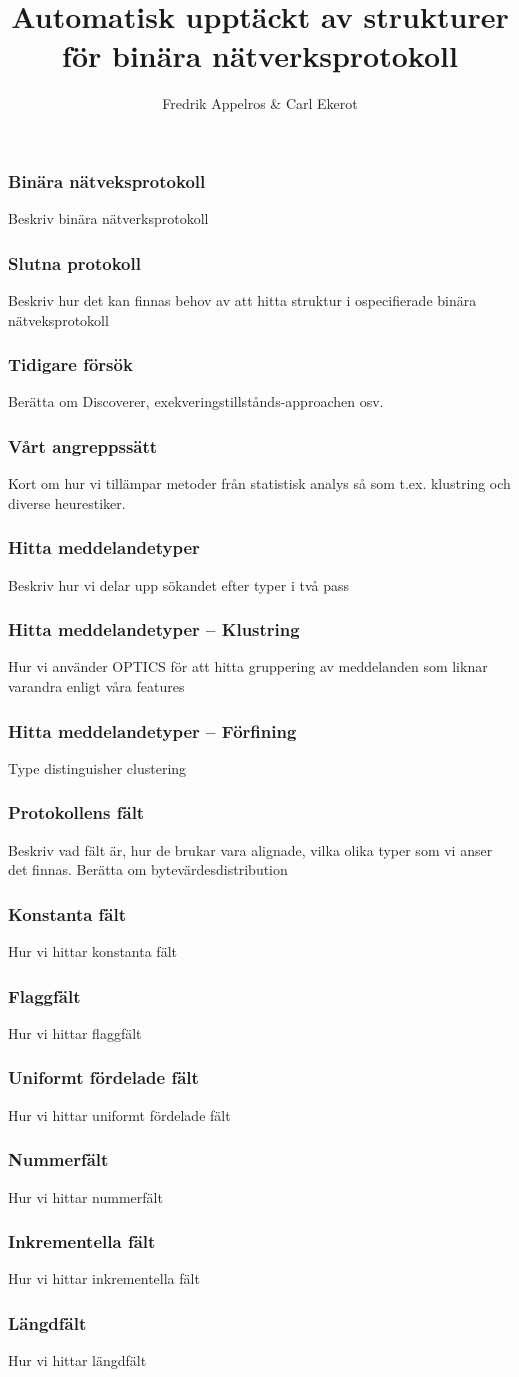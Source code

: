 \documentclass[xetex]{beamer}
\title{Automatisk upptäckt av strukturer för binära nätverksprotokoll}
\author{Fredrik Appelros \& Carl Ekerot}
\date
\begin{document}
    \frame{\titlepage}
    
    \begin{frame}
        \frametitle{Binära nätveksprotokoll}
        Beskriv binära nätverksprotokoll
    \end{frame}
    \begin{frame}
        \frametitle{Slutna protokoll}
        Beskriv hur det kan finnas behov av att hitta struktur i
        ospecifierade binära nätveksprotokoll
    \end{frame}
    \begin{frame}
        \frametitle{Tidigare försök}
        Berätta om Discoverer, exekveringstillstånds-approachen osv.
    \end{frame}

    \begin{frame}
        \frametitle{Vårt angreppssätt}
        Kort om hur vi tillämpar metoder från statistisk analys så
        som t.ex. klustring och diverse heurestiker.
    \end{frame}
    
    \begin{frame}
        \frametitle{Hitta meddelandetyper}
        Beskriv hur vi delar upp sökandet efter typer i två pass
    \end{frame}
    \begin{frame}
        \frametitle{Hitta meddelandetyper -- Klustring}
        Hur vi använder OPTICS för att hitta gruppering av meddelanden som
        liknar varandra enligt våra features
    \end{frame}
    \begin{frame}
        \frametitle{Hitta meddelandetyper -- Förfining}
        Type distinguisher clustering
    \end{frame}

    \begin{frame}
        \frametitle{Protokollens fält}
        Beskriv vad fält är, hur de brukar vara alignade, vilka olika typer
        som vi anser det finnas. Berätta om bytevärdesdistribution
    \end{frame}
    \begin{frame}
        \frametitle{Konstanta fält}
        Hur vi hittar konstanta fält
    \end{frame}
    \begin{frame}
        \frametitle{Flaggfält}
        Hur vi hittar flaggfält
    \end{frame}
    \begin{frame}
        \frametitle{Uniformt fördelade fält}
        Hur vi hittar uniformt fördelade fält
    \end{frame}
    \begin{frame}
        \frametitle{Nummerfält}
        Hur vi hittar nummerfält
    \end{frame}
    \begin{frame}
        \frametitle{Inkrementella fält}
        Hur vi hittar inkrementella fält
    \end{frame}
    \begin{frame}
        \frametitle{Längdfält}
        Hur vi hittar längdfält
    \end{frame}
\end{document}
